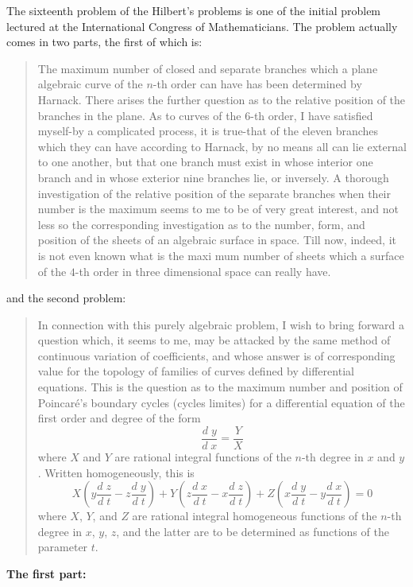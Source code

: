 \documentclass[12pt]{article}
\begin{document}

The sixteenth problem of the Hilbert's problems is one of 
the initial problem lectured at the International Congress 
of Mathematicians.  
The problem actually comes in two parts, the first of which is:
\begin{quote}
The maximum number of closed and separate branches which a plane algebraic curve of the $n$-th order can have has been determined by Harnack.  There arises the further question as to the relative position of the branches in the plane. As to curves of the $6$-th order, I have satisfied myself-by a complicated process, it is true-that of the eleven branches which they can have according to Harnack, by no means all can lie external to one another, but that one branch must exist in whose interior one branch and in whose exterior nine branches lie, or inversely. A thorough investigation of the relative position of the separate branches when their number is the maximum seems to me to be of very great interest, and not less so the corresponding investigation as to the number, form, and position of the sheets of an algebraic surface in space. Till now, indeed, it is not even known what is the maxi mum number of sheets which a surface of the $4$-th order in three dimensional space can really have.\cite{HD}
\end{quote}
and the second problem:
\begin{quote}
In connection with this purely algebraic problem, I wish to bring forward a question which, it seems to me, may be attacked by the same method of continuous variation of coefficients, and whose answer is of corresponding value for the topology of families of curves defined by differential equations. This is the question as to the maximum number and position of Poincar\'e's boundary cycles (cycles limites) for a differential equation of the first order and degree of the form
$$\frac{d\;y}{d\;x} = \frac{Y}{X}$$
where $X$ and $Y$ are rational integral functions of the $n$-th degree in $x$ and $y$. Written homogeneously, this is
$$X\left( y\frac{d\;z}{d\;t} - z\frac{d\;y}{d\;t}\right)+
Y\left( z\frac{d\;x}{d\;t} - x\frac{d\;z}{d\;t}\right)+
Z\left( x\frac{d\;y}{d\;t} - y\frac{d\;x}{d\;t}\right)=0$$
where $X$, $Y$, and $Z$ are rational integral homogeneous functions of the $n$-th degree in $x$, $y$, $z$, and the latter are to be determined as functions of the parameter $t$.
\cite{HD}
\end{quote}
\textbf{The first part:}\\
\end{document}
